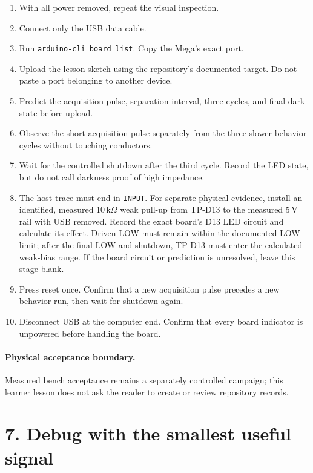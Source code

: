\documentclass[11pt]{article}
\begin{document}
\begin{enumerate}
    \item With all power removed, repeat the visual inspection.
    \item Connect only the USB data cable.
    \item Run \texttt{arduino-cli board list}. Copy the Mega's exact port.
    \item Upload the lesson sketch using the repository's documented target.
          Do not paste a port belonging to another device.
    \item Predict the acquisition pulse, separation interval, three cycles,
          and final dark state before upload.
    \item Observe the short acquisition pulse separately from the three slower
          behavior cycles without touching conductors.
    \item Wait for the controlled shutdown after the third cycle. Record the
          LED state, but do not call darkness proof of high impedance.
    \item The host trace must end in \texttt{INPUT}. For separate physical
          evidence, install an identified, measured 10\,k\(\Omega\) weak
          pull-up from TP-D13 to the measured 5\,V rail with USB removed.
          Record the exact board's D13 LED circuit and calculate its effect.
          Driven LOW must remain within the documented LOW limit; after the
          final LOW and shutdown, TP-D13 must enter the calculated weak-bias
          range. If the board circuit or prediction is unresolved, leave this
          stage blank.
    \item Press reset once. Confirm that a new acquisition pulse precedes a
          new behavior run, then wait for shutdown again.
    \item Disconnect USB at the computer end. Confirm that every board
          indicator is unpowered before handling the board.
\end{enumerate}

\paragraph{Physical acceptance boundary.}
Measured bench acceptance remains a separately controlled campaign; this
learner lesson does not ask the reader to create or review repository records.
\section*{7. Debug with the smallest useful signal}
\end{document}
